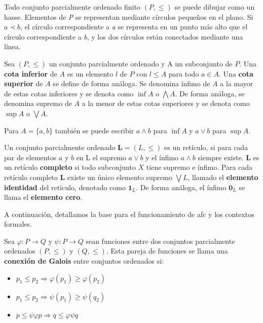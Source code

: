 \documentclass[../../main.tex]{subfiles}
\begin{document}
Todo conjunto parcialmente ordenado finito $(P,\leq)$ se puede dibujar como un \gls{hasse}. 
Elementos de \textit{P} se representan mediante círculos pequeños en el plano. Si $a \prec b$, el círculo correspondiente a \textit{a} se representa en un punto más alto que el círculo correspondiente a \textit{b}, y los dos círculos están conectados mediante una línea. 


\begin{definicion}
Sea $(P,\leq)$ un conjunto parcialmente ordenado y A un subconjunto de $P$. Una \textbf{cota inferior} de $A$ es un elemento $l$ de $P$ con $l \leq A$ para todo $a \in A$. Una \textbf{cota superior} de $A$ se define de forma análoga. Se denomina ínfimo de $A$ a la mayor de estas cotas inferiores y se denota como $\inf A$ o $\bigwedge A$. De forma análoga, se denomina supremo de $A$ a la menor de estas cotas superiores y se denota como $\sup A$ o $\bigvee A$.
\end{definicion}

Para $A = {\{a,b\}}$ también se puede escribir $a \wedge b$ para $\inf A$ y $a \vee b$ para $\sup A$.


\begin{definicion}
Un conjunto parcialmente ordenado $\textbf{L} = (L, \leq)$ es un retículo, si para cada par de elementos $a$ y $b$ en L el supremo $a \vee b$ y el ínfimo $a \wedge b$ siempre existe. $\textbf{L}$ es un retículo \textbf{completo} si todo subconjunto $X$ tiene supremo e ínfimo. Para cada retículo completo $\textbf{L}$ existe un único elemento supremo $\bigvee L$, llamado el \textbf{elemento identidad} del retículo, denotado como $\textbf{1}_L$. De forma análoga, el ínfimo $\textbf{0}_L$ se llama el \textbf{elemento cero}.
\end{definicion}

A continuación, detallamos la base para el funcionamiento de \gls{afc} y los contextos formales.

\begin{definicion}
Sea $\varphi : P \rightarrow Q$ y $\psi : P \rightarrow Q$ sean funciones entre dos conjuntos parcialmente ordenados $(P,\leq)$ y $(Q,\leq)$. Esta pareja de funciones se llama una \textbf{conexión de Galois} entre conjuntos ordenados si:
\begin{itemize}
    \item $p_1 \leq p_2 \Longrightarrow \varphi(p_1) \geq \varphi(p_2)$
    \item $p_1 \leq p_2 \Longrightarrow \psi(p_1) \geq \psi(q_2)$
    \item $p \leq \psi \varphi p \Longrightarrow q \leq \varphi \psi q$
\end{itemize}
\end{definicion}
\end{document}
